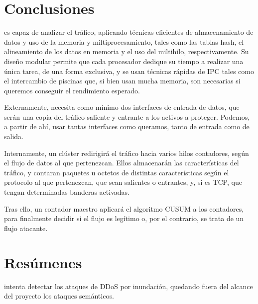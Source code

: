 \section{Conclusiones}
\redborderddos{} es capaz de analizar el tráfico, aplicando técnicas eficientes de almacenamiento de datos y uso de la 
memoria y miltiprocesamiento, tales como las tablas hash, el alineamiento de los datos en memoria y el uso del 
miltihilo, respectivamente. Su diseño modular permite que cada procesador dedique su tiempo a realizar una única tarea, 
de una forma exclusiva, y se usan técnicas rápidas de IPC tales como el intercambio de piscinas que, si bien usan mucha 
memoria, son necesarias si queremos conseguir el rendimiento esperado.

Externamente, \redborderddos{} necesita como mínimo dos interfaces de entrada de datos, que serán una copia del tráfico 
saliente y entrante a los activos a proteger. Podemos, a partir de ahí, usar tantas interfaces como queramos, tanto de 
entrada como de salida.

Internamente, un clúster redirigirá el tráfico hacia varios hilos contadores, según el flujo de datos al que 
pertenezcan. Ellos almacenarán las características del tráfico, y contaran paquetes u octetos de distintas 
características según el protocolo al que pertenezcan, que sean salientes o entrantes, y, si es \gls{TCP}, que tengan 
determinadas banderas activadas.

Tras ello, un contador maestro aplicará el algoritmo \gls{CUSUM} a los contadores, para finalmente decidir si el flujo 
es legítimo o, por el contrario, se trata de un flujo atacante.

\section{Resúmenes}%
\begin{Resumen}
\redborderddos{} intenta detectar los ataques de \gls{DDoS} por inundación, quedando fuera del alcance del proyecto los 
ataques semánticos.
\end{Resumen}

